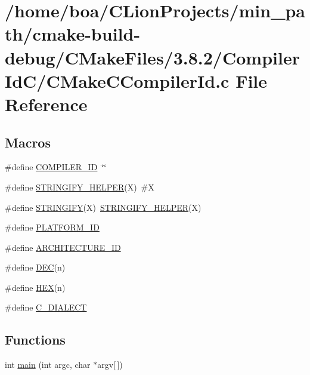 \hypertarget{a00014}{}\section{/home/boa/\+C\+Lion\+Projects/min\+\_\+path/cmake-\/build-\/debug/\+C\+Make\+Files/3.8.2/\+Compiler\+Id\+C/\+C\+Make\+C\+Compiler\+Id.c File Reference}
\label{a00014}
\subsection*{Macros}
\begin{DoxyCompactItemize}
\item 
\#define \hyperlink{a00014_a81dee0709ded976b2e0319239f72d174_a81dee0709ded976b2e0319239f72d174}{C\+O\+M\+P\+I\+L\+E\+R\+\_\+\+ID}~\char`\"{}\char`\"{}
\item 
\#define \hyperlink{a00014_a2ae9b72bb13abaabfcf2ee0ba7d3fa1d_a2ae9b72bb13abaabfcf2ee0ba7d3fa1d}{S\+T\+R\+I\+N\+G\+I\+F\+Y\+\_\+\+H\+E\+L\+P\+ER}(X)~\#X
\item 
\#define \hyperlink{a00014_a43e1cad902b6477bec893cb6430bd6c8_a43e1cad902b6477bec893cb6430bd6c8}{S\+T\+R\+I\+N\+G\+I\+FY}(X)~\hyperlink{a00015_a2ae9b72bb13abaabfcf2ee0ba7d3fa1d_a2ae9b72bb13abaabfcf2ee0ba7d3fa1d}{S\+T\+R\+I\+N\+G\+I\+F\+Y\+\_\+\+H\+E\+L\+P\+ER}(X)
\item 
\#define \hyperlink{a00014_adbc5372f40838899018fadbc89bd588b_adbc5372f40838899018fadbc89bd588b}{P\+L\+A\+T\+F\+O\+R\+M\+\_\+\+ID}
\item 
\#define \hyperlink{a00014_aba35d0d200deaeb06aee95ca297acb28_aba35d0d200deaeb06aee95ca297acb28}{A\+R\+C\+H\+I\+T\+E\+C\+T\+U\+R\+E\+\_\+\+ID}
\item 
\#define \hyperlink{a00014_ad1280362da42492bbc11aa78cbf776ad_ad1280362da42492bbc11aa78cbf776ad}{D\+EC}(n)
\item 
\#define \hyperlink{a00014_a46d5d95daa1bef867bd0179594310ed5_a46d5d95daa1bef867bd0179594310ed5}{H\+EX}(n)
\item 
\#define \hyperlink{a00014_a07f8e5783674099cd7f5110e22a78cdb_a07f8e5783674099cd7f5110e22a78cdb}{C\+\_\+\+D\+I\+A\+L\+E\+CT}
\end{DoxyCompactItemize}
\subsection*{Functions}
\begin{DoxyCompactItemize}
\item 
int \hyperlink{a00014_a0ddf1224851353fc92bfbff6f499fa97_a0ddf1224851353fc92bfbff6f499fa97}{main} (int argc, char $\ast$argv\mbox{[}$\,$\mbox{]})
\end{DoxyCompactItemize}
